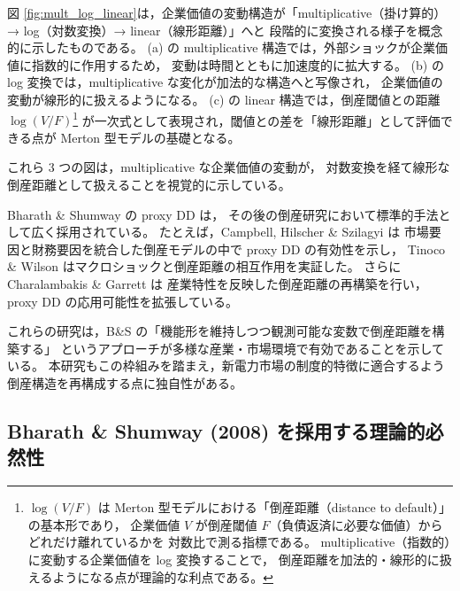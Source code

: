 図 \ref{fig:mult_log_linear}は，企業価値の変動構造が「multiplicative（掛け算的）→ log（対数変換）→ linear（線形距離）」へと
段階的に変換される様子を概念的に示したものである。
(a) の multiplicative 構造では，外部ショックが企業価値に指数的に作用するため，
変動は時間とともに加速度的に拡大する。
(b) の log 変換では，multiplicative な変化が加法的な構造へと写像され，
企業価値の変動が線形的に扱えるようになる。
(c) の linear 構造では，倒産閾値との距離 $\log(V/F)$\footnote{
$\log(V/F)$ は Merton 型モデルにおける「倒産距離（distance to default）」の基本形であり，
企業価値 $V$ が倒産閾値 $F$（負債返済に必要な価値）からどれだけ離れているかを
対数比で測る指標である。
multiplicative（指数的）に変動する企業価値を log 変換することで，
倒産距離を加法的・線形的に扱えるようになる点が理論的な利点である。
}
が一次式として表現され，閾値との差を「線形距離」として評価できる点が
Merton 型モデルの基礎となる。

これら 3 つの図は，multiplicative な企業価値の変動が，
対数変換を経て線形な倒産距離として扱えることを視覚的に示している。


Bharath \& Shumway \parencite{BharathShumway2008} の proxy DD は，
その後の倒産研究において標準的手法として広く採用されている。
たとえば，Campbell, Hilscher \& Szilagyi \parencite{CampbellHilscherSzilagyi2008} は
市場要因と財務要因を統合した倒産モデルの中で proxy DD の有効性を示し，
Tinoco \& Wilson \parencite{TinocoWilson2013} はマクロショックと倒産距離の相互作用を実証した。
さらに Charalambakis \& Garrett \parencite{CharalambakisGarrett2019} は
産業特性を反映した倒産距離の再構築を行い，proxy DD の応用可能性を拡張している。


これらの研究は，B\&S の「機能形を維持しつつ観測可能な変数で倒産距離を構築する」
というアプローチが多様な産業・市場環境で有効であることを示している。
本研究もこの枠組みを踏まえ，新電力市場の制度的特徴に適合するよう
倒産構造を再構成する点に独自性がある。



\vspace{1em}
\subsection{Bharath \& Shumway (2008) を採用する理論的必然性}

